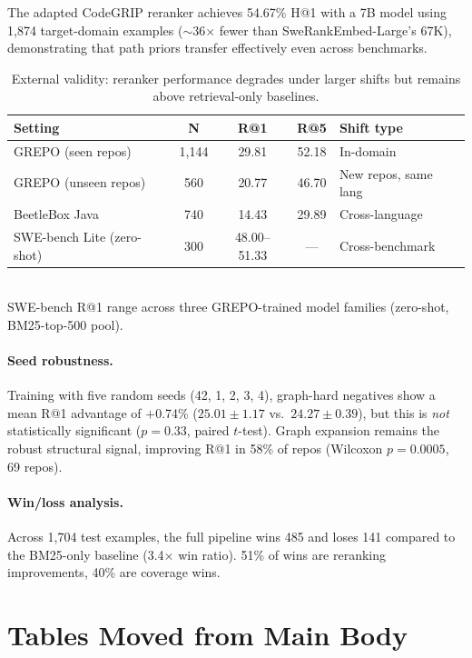 \documentclass{article}
\begin{document}
The adapted CodeGRIP reranker achieves 54.67\% H@1 with a 7B model using 1,874 target-domain examples ($\sim$36$\times$ fewer than SweRankEmbed-Large's 67K), demonstrating that path priors transfer effectively even across benchmarks.

\begin{table}[h]
\centering
\caption{External validity: reranker performance degrades under larger shifts but remains above retrieval-only baselines.}
\label{tab:external}
\small
\begin{tabular}{lcccl}
\toprule
\textbf{Setting} & \textbf{N} & \textbf{R@1} & \textbf{R@5} & \textbf{Shift type} \\
\midrule
GREPO (seen repos) & 1,144 & 29.81 & 52.18 & In-domain \\
GREPO (unseen repos) & 560 & 20.77 & 46.70 & New repos, same lang \\
BeetleBox Java & 740 & 14.43 & 29.89 & Cross-language \\
SWE-bench Lite (zero-shot) & 300 & 48.00--51.33 & --- & Cross-benchmark \\
\bottomrule
\end{tabular}
\\[2pt]
{\footnotesize SWE-bench R@1 range across three GREPO-trained model families (zero-shot, BM25-top-500 pool).}
\end{table}

\paragraph{Seed robustness.}
Training with five random seeds (42, 1, 2, 3, 4), graph-hard negatives show a mean R@1 advantage of $+$0.74\% ($25.01 \pm 1.17$ vs.\ $24.27 \pm 0.39$), but this is \emph{not} statistically significant ($p = 0.33$, paired $t$-test).
Graph expansion remains the robust structural signal, improving R@1 in 58\% of repos (Wilcoxon $p = 0.0005$, 69 repos).

\paragraph{Win/loss analysis.}
Across 1,704 test examples, the full pipeline wins 485 and loses 141 compared to the BM25-only baseline (3.4$\times$ win ratio).
51\% of wins are reranking improvements, 40\% are coverage wins.


\section{Tables Moved from Main Body}
\label{app:moved_tables}
\end{document}
